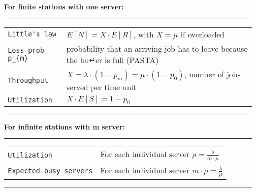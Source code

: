 \textbf{For finite stations with one server:}
\hrule
{}
\begin{tabular}{@{}p{\the\MyLen}@{}p{\linewidth-\the\MyLen}@{}}
\verb!Little's law!				&	$E[N] = X \cdot E[R]$, with $X=\mu$ if overloaded\\
\verb!Loss prob p_{m}!		&	probability that an arriving job has to leave because the bu↵er is full (PASTA)\\
\verb!Throughput!			&	$X = \lambda \cdot (1-p_{m}) = \mu \cdot (1- p_{0})$, number of jobs served per time unit\\
\verb!Utilization!			&	$X \cdot E[S] = 1 - p_{0}$\\
\end{tabular}
\hrule

\textbf{For infinite stations with m server:}
\hrule
{}
\begin{tabular}{@{}p{\the\MyLen}@{}p{\linewidth-\the\MyLen}@{}}
\verb!Utilization!			&	For each individual server $\rho = \frac{\lambda}{m \cdot \mu}$\\
\verb!Expected busy servers!			&	For each individual server $m \cdot \rho = \frac{\lambda}{\mu}$\\
\end{tabular}
\hrule




\blindtext
\blindtext
\blindtext
\blindtext
\blindtext
\blindtext